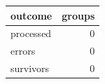 \begin{tabular}{lr}
\toprule
outcome & groups\\
\midrule
processed & 0\\
errors & 0\\
survivors & 0\\
\bottomrule
\end{tabular}
